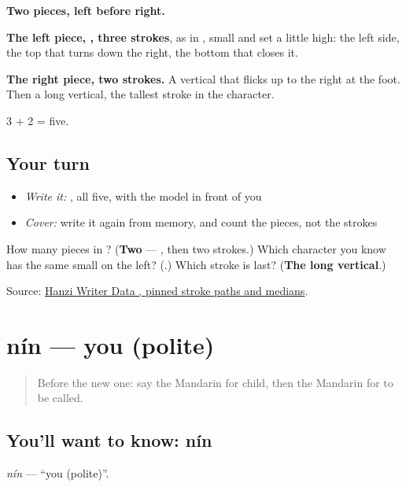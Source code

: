 \begin{quote}
\end{quote}

\textbf{Two pieces, left before right.}

\textbf{The left piece, , three strokes}, as in , small and set a little high: the left side, the top that turns down the right, the bottom that closes it.

\textbf{The right piece, two strokes.} A vertical that flicks up to the right at the foot. Then a long vertical, the tallest stroke in the character.

3 + 2 = five.

\subsection*{Your turn}
\begin{itemize}
\raggedright
  \item \emph{Write it:} , all five, with the model in front of you
  \item \emph{Cover:} write it again from memory, and count the pieces, not the strokes
\end{itemize}

\begin{tcolorbox}[breakable,colback=teal!4,colframe=teal!35!black,title={Before you move on}]
How many pieces in ? (\textbf{Two} — , then two strokes.) Which character you know has the same small  on the left? (\textbf{}.) Which stroke is last? (\textbf{The long vertical}.)

Source: \href{https://raw.githubusercontent.com/chanind/hanzi-writer-data/68d10a4b21150cae5e1ebbd223eed289cf32d90c/data/\%E5\%8F\%AB.json}{Hanzi Writer Data , pinned stroke paths and medians}.
\end{tcolorbox}
\section[nín]{nín — you (polite)}

\label{lesson:ZH-C34-nin}



\begin{quote}
Before the new one: say the Mandarin for child, then the Mandarin for to be called.
\end{quote}

\subsection*{You'll want to know: nín}
\emph{nín} — \textquotedblleft{}you (polite)\textquotedblright{}.

